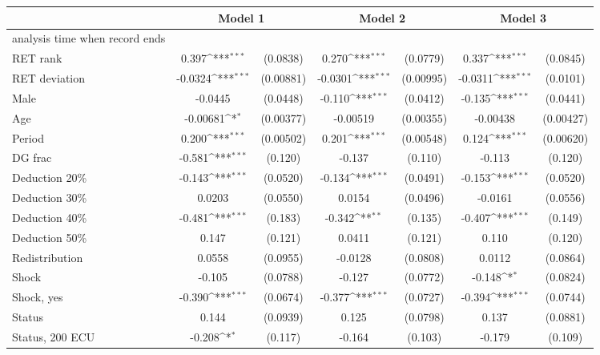 {
\def\sym#1{\ifmmode^{#1}\else\(^{#1}\)\fi}
\begin{tabular}{l*{3}{cc}}
\hline\hline
                &\multicolumn{2}{c}{Model 1} &\multicolumn{2}{c}{Model 2} &\multicolumn{2}{c}{Model 3} \\
\hline
analysis time when record ends&                  &         &                  &         &                  &         \\
RET rank        &    0.397\sym{***}& (0.0838)&    0.270\sym{***}& (0.0779)&    0.337\sym{***}& (0.0845)\\
RET deviation   &  -0.0324\sym{***}&(0.00881)&  -0.0301\sym{***}&(0.00995)&  -0.0311\sym{***}& (0.0101)\\
Male            &  -0.0445         & (0.0448)&   -0.110\sym{***}& (0.0412)&   -0.135\sym{***}& (0.0441)\\
Age             & -0.00681\sym{*}  &(0.00377)& -0.00519         &(0.00355)& -0.00438         &(0.00427)\\
Period          &    0.200\sym{***}&(0.00502)&    0.201\sym{***}&(0.00548)&    0.124\sym{***}&(0.00620)\\
DG frac         &   -0.581\sym{***}&  (0.120)&   -0.137         &  (0.110)&   -0.113         &  (0.120)\\
Deduction 20\%  &   -0.143\sym{***}& (0.0520)&   -0.134\sym{***}& (0.0491)&   -0.153\sym{***}& (0.0520)\\
Deduction 30\%  &   0.0203         & (0.0550)&   0.0154         & (0.0496)&  -0.0161         & (0.0556)\\
Deduction 40\%  &   -0.481\sym{***}&  (0.183)&   -0.342\sym{**} &  (0.135)&   -0.407\sym{***}&  (0.149)\\
Deduction 50\%  &    0.147         &  (0.121)&   0.0411         &  (0.121)&    0.110         &  (0.120)\\
Redistribution  &   0.0558         & (0.0955)&  -0.0128         & (0.0808)&   0.0112         & (0.0864)\\
Shock           &   -0.105         & (0.0788)&   -0.127         & (0.0772)&   -0.148\sym{*}  & (0.0824)\\
Shock, yes      &   -0.390\sym{***}& (0.0674)&   -0.377\sym{***}& (0.0727)&   -0.394\sym{***}& (0.0744)\\
Status          &    0.144         & (0.0939)&    0.125         & (0.0798)&    0.137         & (0.0881)\\
Status, 200 ECU &   -0.208\sym{*}  &  (0.117)&   -0.164         &  (0.103)&   -0.179         &  (0.109)\\

\end{tabular}}
